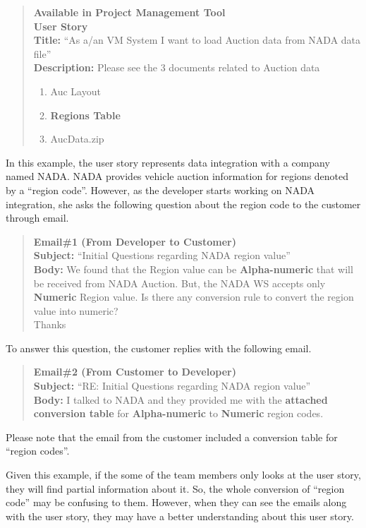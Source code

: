 \begin{quote}
	\textbf{Available in Project Management Tool}\\
	\textbf{User Story}\\
	\textbf{Title:} ``As a/an VM System I want to load Auction data from NADA data file''\\
	\textbf{Description:} Please see the 3 documents related to Auction data
	\begin{enumerate}
		\item Auc Layout
		\item \textbf{Regions Table}
		\item AucData.zip
	\end{enumerate}
\end{quote}

In this example, the user story represents data integration with a company named NADA. NADA provides vehicle auction information for regions denoted by a ``region code''. However, as the developer starts working on NADA integration, she asks the following question about the region code to the customer through email. 

\begin{quote}
\textbf{Email\#1 (From Developer to Customer)}\\
\textbf{Subject:} ``Initial Questions regarding NADA region value''\\
\textbf{Body:} We found that the Region value can be \textbf{Alpha-numeric} that will be received from NADA Auction. But, the NADA WS accepts only \textbf{Numeric} Region value. Is there any conversion rule to convert the region value into numeric? \\
Thanks
\end{quote}

To answer this question, the customer replies with the following email.

\begin{quote}
\textbf{Email\#2 (From Customer to Developer)}\\
\textbf{Subject:} ``RE: Initial Questions regarding NADA region value''\\
\textbf{Body:} I talked to NADA and they provided me with the \textbf{attached conversion table} for \textbf{Alpha-numeric} to \textbf{Numeric} region codes.
\end{quote}

Please note that the email from the customer included a conversion table for ``region codes''. 

Given this example, if the some of the team members only looks at the user story, they will find partial information about it. So, the whole conversion of ``region code''  may be confusing to them. However, when they can see the emails along with the user story, they may have a better understanding about this user story.

